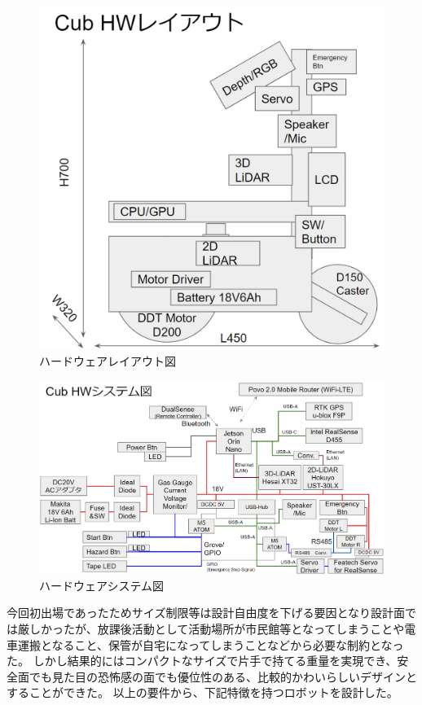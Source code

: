 \documentclass[platex,dvipdfmx]{rbproceedings}
\begin{document}
\begin{figure}
    \centering
    \includegraphics[width=0.8\linewidth]{picture/tc2023CubHWLayout.png}
    \caption{ハードウェアレイアウト図}
    \label{fig:hw-layout}
\end{figure}

\begin{figure}
    \centering
    \includegraphics[width=1.0\linewidth]{picture/tc2023CubHW.png}
    \caption{ハードウェアシステム図}
    \label{fig:hw-system}
\end{figure}

今回初出場であったためサイズ制限等は設計自由度を下げる要因となり設計面では厳しかったが、放課後活動として活動場所が市民館等となってしまうことや電車運搬となること、保管が自宅になってしまうことなどから必要な制約となった。
しかし結果的にはコンパクトなサイズで片手で持てる重量を実現でき、安全面でも見た目の恐怖感の面でも優位性のある、比較的かわいらしいデザインとすることができた。
以上の要件から、下記特徴を持つロボットを設計した。
\end{document}
